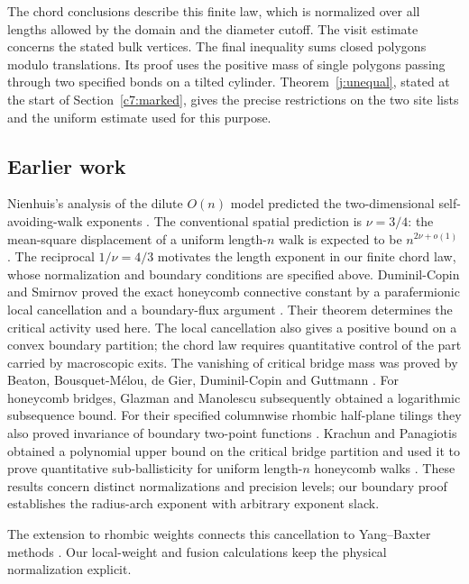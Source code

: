 The chord conclusions describe this finite law, which is normalized
over all lengths allowed by the domain and the diameter cutoff. The
visit estimate concerns the stated bulk vertices. The final inequality
sums closed polygons modulo translations. Its proof uses the
positive mass of single polygons passing through two specified bonds
on a tilted cylinder. Theorem~\ref{j:unequal}, stated at the start of
Section~\ref{c7:marked}, gives the precise restrictions on the two site
lists and the uniform estimate used for this purpose.

\subsection{Earlier work}

Nienhuis's analysis of the dilute $O(n)$ model predicted the
two-dimensional self-avoiding-walk exponents \cite{Nienhuis1982}.
The conventional spatial prediction is $\nu=3/4$: the mean-square
displacement of a uniform length-$n$ walk is expected to be
$n^{2\nu+o(1)}$ \cite[Equation~(8)]{DuminilCopinSmirnov2012}.
The reciprocal $1/\nu=4/3$ motivates the length exponent in our finite
chord law, whose normalization and boundary conditions are specified above.
Duminil-Copin and Smirnov proved the exact honeycomb connective constant
by a parafermionic local cancellation and a boundary-flux argument
\cite{DuminilCopinSmirnov2012}. Their theorem determines the critical
activity used here. The local cancellation also gives a positive bound
on a convex boundary partition; the chord law requires quantitative
control of the part carried by macroscopic exits.
The vanishing of critical bridge mass was proved by Beaton,
Bousquet-M\'elou, de Gier, Duminil-Copin and Guttmann
\cite{BeatonEtAl2014}. For honeycomb bridges, Glazman and Manolescu
subsequently obtained a logarithmic subsequence bound. For their specified
columnwise rhombic half-plane tilings they also proved invariance of boundary
two-point functions \cite[Theorem~1 and Proposition~1.1]{GlazmanManolescu2017}.
Krachun and Panagiotis obtained a polynomial upper bound on the critical
bridge partition and used it to prove quantitative sub-ballisticity for
uniform length-$n$ honeycomb walks \cite{KrachunPanagiotis2026}.
These results concern distinct normalizations and precision levels;
our boundary proof establishes the radius-arch exponent with arbitrary
exponent slack.

The extension to rhombic weights connects this cancellation to
Yang--Baxter methods \cite{GlazmanManolescu2017}. Our local-weight and
fusion calculations keep the physical normalization explicit.

